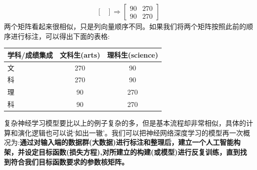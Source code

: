 \documentclass[12pt]{article}
\numberwithin{equation}{section}
\numberwithin{figure}{section}
\begin{document}
\begin{example}
\begin{align*}
\begin{bmatrix}
	\end{bmatrix} \Rightarrow \begin{bmatrix}
		90 & 270 \\
		90 & 270 
	\end{bmatrix}
\end{align*}
两个矩阵看起来很相似，只是列向量顺序不同。如果我们将两个矩阵按照此前的顺序进行标注，可以得出下面的表格:
\begin{table}[H]
\renewcommand{\arraystretch}{1.2}
	\centering
	\begin{tabular}{|l|cc|}
	\hline 
		学科/成绩集成 & 文科生(arts) & 理科生(science) \\
		\hline 
		文& 270 & 90 \\
		科& 270 & 90 \\
		\hline 
		理& 90 & 270 \\
		科& 90 & 270 \\
		\hline 
	\end{tabular}
\end{table}
\end{example}

复杂神经学习模型要比以上的例子复杂的多，但是基本流程却非常相似，具体的计算和演化逻辑也可以说`如出一辙'。我们可以把神经网络深度学习的模型再一次概况为:\textbf{通过对输入端的数据群(大数据)进行标注和整理后，建立一个人工智能构架，并设定目标函数(损失方程),对所建立的构建(或模型)进行反复训练，直到找到符合我们目标函数要求的参数核矩阵。}
\end{document}
